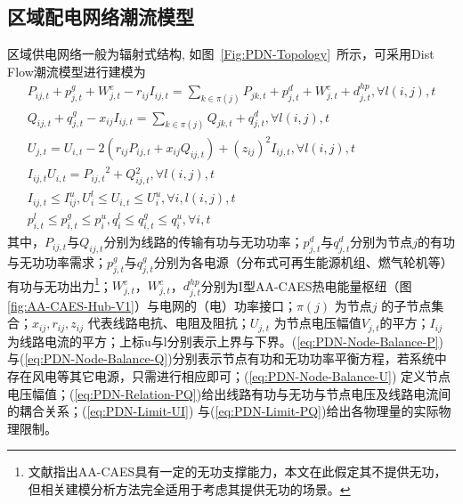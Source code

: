 \subsection{区域配电网络潮流模型}
\label{sec:st-case-dispatch-PDN}
区域供电网络一般为辐射式结构, 如图~\ref{Fig:PDN-Topology}~所示，可采用Dist Flow潮流模型进行建模为\cite{Distflow-WFL, Branchflow-SH1}
\begin{subequations}
\label{eq:PDN-Branch-Flow-All}
\begin{gather}
P_{ij,t} + p_{j,t}^g + W_{j,t}^e - r_{ij}I_{ij,t} = \sum\limits_{k \in \pi(j)} {P_{jk,t}}+ p_{j,t}^d +  W_{j,t}^c + d_{j,t}^{hp},\forall l({i,j}),t \label{eq:PDN-Node-Balance-P}\\
Q_{ij,t} + q_{j,t}^g - x_{ij}I_{ij,t} = \sum\limits_{k \in \pi(j)} {{Q_{jk,t}}}+ q_{j,t}^d,\forall l({i,j}),t \label{eq:PDN-Node-Balance-Q}\\
{U_{j,t}} = {U_{i,t}}-2({{r_{ij}}P_{ij,t} + x_{ij}{Q_{ij,t}}}) + {({{z_{ij}}})^2}{I_{ij,t}},\forall l({i,j}),t \label{eq:PDN-Node-Balance-U}\\
{I_{ij,t}}{U_{i,t}} = {P_{ij,t}}^2 + Q{_{ij,t}^2},\forall l({i,j}),t \label{eq:PDN-Relation-PQ}\\
I_{ij,t} \le I_{ij}^u,U_i^l \le {U_{i,t}} \le U_i^u,\forall i,l({i,j}),t \label{eq:PDN-Limit-UI}\\
p_{i,t}^l \le p_{i,t}^g \le p_i^u,q_i^l \le q_{i,t}^g \le q_i^u,\forall i,t \label{eq:PDN-Limit-PQ}
\end{gather}
\end{subequations}
其中，$P_{ij,t}$与${Q_{ij,t}}$分别为线路的传输有功与无功功率；$p_{j,t}^d$与$q_{j,t}^d$分别为节点$j$的有功与无功功率需求；$p_{j,t}^g$与$q_{j,t}^g$分别为各电源（分布式可再生能源机组、燃气轮机等）有功与无功出力\footnote{文献指出AA-CAES具有一定的无功支撑能力，本文在此假定其不提供无功，但相关建模分析方法完全适用于考虑其提供无功的场景。}；$W_{j,t}^e$，$W_{j,t}^c$，$d_{j,t}^{hp}$分别为I型AA-CAES热电能量枢纽（图
\ref{fig:AA-CAES-Hub-V1}）与电网的（电）功率接口；$\pi(j)$ 为节点$j$ 的子节点集合；${x_{ij}},{r_{ij}},{z_{ij}}$ 代表线路电抗、电阻及阻抗；${U_{j,t}}$ 为节点电压幅值$V_{j,t}$的平方；${I_{ij}}$ 为线路电流的平方；上标u与l分别表示上界与下界。(\ref{eq:PDN-Node-Balance-P})与(\ref{eq:PDN-Node-Balance-Q})分别表示节点有功和无功功率平衡方程，若系统中存在风电等其它电源，只需进行相应即可；(\ref{eq:PDN-Node-Balance-U}) 定义节点电压幅值；(\ref{eq:PDN-Relation-PQ})给出线路有功与无功与节点电压及线路电流间的耦合关系；(\ref{eq:PDN-Limit-UI}) 与(\ref{eq:PDN-Limit-PQ})给出各物理量的实际物理限制。

